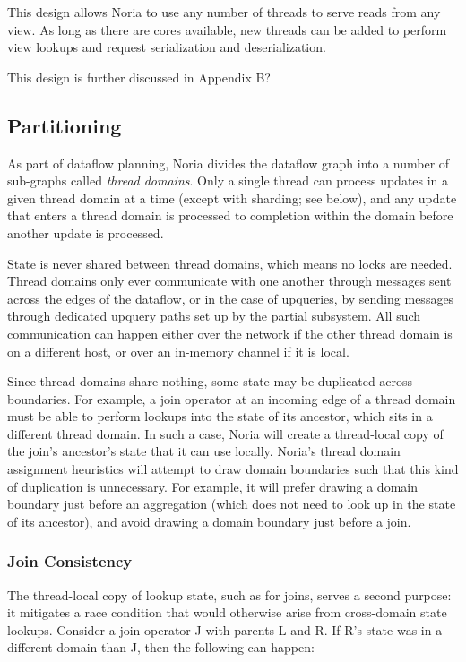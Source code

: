 This design allows Noria to use any number of threads to serve reads from any
view. As long as there are cores available, new threads can be added to perform
view lookups and request serialization and deserialization.

\begin{inprogress}
  This design is further discussed in Appendix B?
\end{inprogress}

\subsection{Partitioning}

As part of dataflow planning, Noria divides the dataflow graph into a number of
sub-graphs called \textit{thread domains}. Only a single thread can process
updates in a given thread domain at a time (except with sharding; see below),
and any update that enters a thread domain is processed to completion within
the domain before another update is processed.

State is never shared between thread domains, which means no locks are needed.
Thread domains only ever communicate with one another through messages sent
across the edges of the dataflow, or in the case of upqueries, by sending
messages through dedicated upquery paths set up by the partial subsystem. All
such communication can happen either over the network if the other thread domain
is on a different host, or over an in-memory channel if it is local.

Since thread domains share nothing, some state may be duplicated across
boundaries. For example, a join operator at an incoming edge of a thread domain
must be able to perform lookups into the state of its ancestor, which sits in a
different thread domain. In such a case, Noria will create a thread-local copy
of the join's ancestor's state that it can use locally. Noria's thread domain
assignment heuristics will attempt to draw domain boundaries  such that this
kind of duplication is unnecessary. For example, it will prefer drawing a domain
boundary just before an aggregation (which does not need to look up in the state
of its ancestor), and avoid drawing a domain boundary just before a join.

\subsubsection{Join Consistency}
\label{s:join-state-dupe}

The thread-local copy of lookup state, such as for joins, serves a second
purpose: it mitigates a race condition that would otherwise arise from
cross-domain state lookups. Consider a join operator J with parents L and R. If
R's state was in a different domain than J, then the following can happen:


